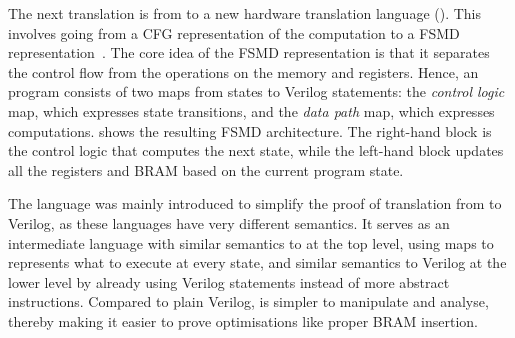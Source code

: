 The next translation is from \rtl{} to a new hardware translation language
(\htl{}). %
This involves going from a CFG representation of the computation to a \gls{FSMD}
representation~\cite{hwang99_ffplp}. The core idea of the FSMD representation is
that it separates the control flow from the operations on the memory and
registers. %
Hence, an \htl{} program consists of two maps from states to Verilog statements:
the \emph{\gls{control logic}} map, which expresses state transitions, and the
\emph{\gls{data path}} map, which expresses computations.
 shows the resulting \gls{FSMD} architecture. The
right-hand block is the control logic that computes the next state, while the
left-hand block updates all the registers and \gls{BRAM} based on the current
program state.

The \htl{} language was mainly introduced to simplify the proof of translation
from \rtl{} to Verilog, as these languages have very different semantics.  It
serves as an intermediate language with similar semantics to \rtl{} at the top
level, using maps to represents what to execute at every state, and similar
semantics to Verilog at the lower level by already using Verilog statements
instead of more abstract instructions.  Compared to plain Verilog, \htl{} is
simpler to manipulate and analyse, thereby making it easier to prove
optimisations like proper \gls{BRAM} insertion.

